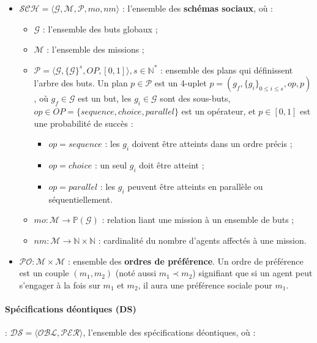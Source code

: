 \begin{itemize}
    \item $\mathcal{SCH} = \langle\mathcal{G}, \mathcal{M}, \mathcal{P}, mo, nm \rangle$ : l'ensemble des \textbf{schémas sociaux}, où :
    \begin{itemize}
        \item $\mathcal{G}$ : l'ensemble des buts globaux ;
        \item $\mathcal{M}$ : l'ensemble des missions ;
        \item $\mathcal{P} = \langle \mathcal{G}, \{\mathcal{G}\}^s, OP, [0,1] \rangle, s \in \mathbb{N}^*$ : ensemble des plans qui définissent l'arbre des buts.
        Un plan $p \in \mathcal{P}$ est un 4-uplet $p = (g_f, \{g_i\}_{0 \leq i \leq s}, op, p)$, où $g_f \in \mathcal{G}$ est un but, les $g_i \in \mathcal{G}$ sont des sous-buts, $op \in OP = \{sequence, choice, parallel\}$ est un opérateur, et $p \in [0,1]$ est une probabilité de succès :
        \begin{itemize}
            \item $op = sequence$ : les $g_i$ doivent être atteints dans un ordre précis ;
            \item $op = choice$ : un seul $g_i$ doit être atteint ;
            \item $op = parallel$ : les $g_i$ peuvent être atteints en parallèle ou séquentiellement.
        \end{itemize}
        \item $mo: \mathcal{M} \rightarrow \mathbb{P}(\mathcal{G})$ : relation liant une mission à un ensemble de buts ;
        \item $nm: \mathcal{M} \rightarrow \mathbb{N} \times \mathbb{N}$ : cardinalité du nombre d'agents affectés à une mission.
    \end{itemize}
    \item $\mathcal{PO}: \mathcal{M} \times \mathcal{M}$ : ensemble des \textbf{ordres de préférence}. Un ordre de préférence est un couple $(m_1, m_2)$ (noté aussi $m_1 \prec m_2$) signifiant que si un agent peut s'engager à la fois sur $m_1$ et $m_2$, il aura une préférence sociale pour $m_1$.
\end{itemize}

\paragraph{\textbf{Spécifications déontiques (DS)}} : $\mathcal{DS} = \langle \mathcal{OBL}, \mathcal{PER} \rangle$, l'ensemble des spécifications déontiques, où :

